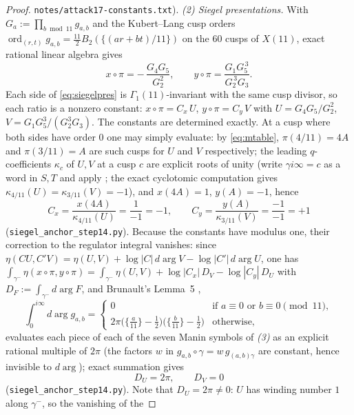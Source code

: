 \documentclass[preprint,12pt]{elsarticle}
\theoremstyle{definition}
\theoremstyle{remark}
\begin{document}
\begin{proof}
\texttt{notes/attack17-constants.txt}).
\emph{(2) Siegel presentations.}  With
$G_a:=\prod_{b\bmod 11}g_{a,b}$ and the Kubert--Lang cusp orders
$\operatorname{ord}_{(r,t)}g_{a,b}=\tfrac{11}{2}B_2(\{(ar+bt)/11\})$ on the
$60$ cusps of $X(11)$, exact rational linear algebra gives
\begin{equation}\label{eq:siegelpres}
  x\circ\pi=-\,\frac{G_4G_5}{G_2^2},
  \qquad
  y\circ\pi=\frac{G_1G_5^{\,3}}{G_2^{\,3}G_3}.
\end{equation}
Each side of \eqref{eq:siegelpres} is $\Gamma_1(11)$-invariant with the
same cusp divisor, so each ratio is a nonzero constant:
$x\circ\pi=C_x\,U$, $y\circ\pi=C_y\,V$ with $U=G_4G_5/G_2^2$,
$V=G_1G_5^3/(G_2^3G_3)$.  The constants are determined exactly.  At a
cusp where both sides have order $0$ one may simply evaluate: by
\eqref{eq:mtable}, $\pi(4/11)=4A$ and $\pi(3/11)=A$ are such cusps for
$U$ and $V$ respectively; the leading $q$-coefficients $\kappa_c$ of
$U,V$ at a cusp $c$ are explicit roots of unity (write
$\gamma i\infty=c$ as a word in $S,T$ and apply
\cite[Lemma~4 and eq.~(3)]{BrunaultSiegel}; the exact cyclotomic
computation gives $\kappa_{4/11}(U)=\kappa_{3/11}(V)=-1$), and
$x(4A)=1$, $y(A)=-1$, hence
\[
  C_x=\frac{x(4A)}{\kappa_{4/11}(U)}=\frac{1}{-1}=-1,\qquad
  C_y=\frac{y(A)}{\kappa_{3/11}(V)}=\frac{-1}{-1}=+1
\]
(\texttt{siegel\_anchor\_step14.py}).  Because the constants have modulus
one, their correction to the regulator integral vanishes: since
$\eta(CU,C'V)=\eta(U,V)+\log|C|\,d\!\arg V-\log|C'|\,d\!\arg U$, one has
$\int_{\gamma^-}\eta(x\circ\pi,y\circ\pi)=\int_{\gamma^-}\eta(U,V)
 +\log|C_x|\,D_V-\log|C_y|\,D_U$ with $D_F:=\int_{\gamma^-}d\!\arg F$,
and Brunault's Lemma~5 \cite{BrunaultSiegel},
\[
  \int_0^{i\infty}d\!\arg g_{a,b}=
  \begin{cases}
    0 & \text{if }a\equiv0\text{ or }b\equiv0\pmod{11},\\[1mm]
    2\pi\bigl(\{\tfrac{a}{11}\}-\tfrac12\bigr)
        \bigl(\{\tfrac{b}{11}\}-\tfrac12\bigr) & \text{otherwise},
  \end{cases}
\]
evaluates each piece of each of the seven Manin symbols of \emph{(3)} as
an explicit rational multiple of $2\pi$ (the factors $w$ in
$g_{a,b}\circ\gamma=w\,g_{(a,b)\gamma}$ are constant, hence invisible to
$d\!\arg$); exact summation gives
\begin{equation}\label{eq:DUDV}
  D_U=2\pi,\qquad D_V=0
\end{equation}
(\texttt{siegel\_anchor\_step14.py}).  Note that $D_U=2\pi\neq0$: $U$
has winding number $1$ along $\gamma^-$, so the vanishing of the

\end{proof}
\end{document}
